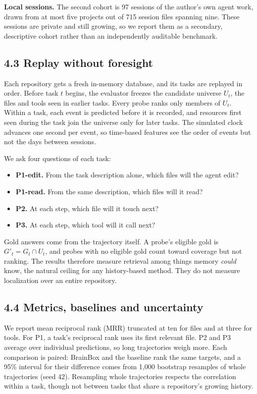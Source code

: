 \documentclass[
  american,
  11pt,
]{article}
\providecommand{\tightlist}{%
  \setlength{\itemsep}{0pt}\setlength{\parskip}{0pt}}
\begin{document}
\textbf{Local sessions.} The second cohort is 97 sessions of the author's own agent work, drawn from at most
five projects out of 715 session files spanning nine. These sessions are private and still growing, so we
report them as a secondary, descriptive cohort rather than an independently auditable benchmark.

\subsection{4.3 Replay without foresight}\label{replay-without-foresight}

Each repository gets a fresh in-memory database, and its tasks are replayed in order. Before task \(t\)
begins, the evaluator freezes the candidate universe \(U_t\), the files and tools seen in earlier tasks. Every
probe ranks only members of \(U_t\). Within a task, each event is predicted before it is recorded, and
resources first seen during the task join the universe only for later tasks. The simulated clock advances one
second per event, so time-based features see the order of events but not the days between sessions.

We ask four questions of each task:

\begin{itemize}
\tightlist
\item
  \textbf{P1-edit.} From the task description alone, which files will the agent edit?
\item
  \textbf{P1-read.} From the same description, which files will it read?
\item
  \textbf{P2.} At each step, which file will it touch next?
\item
  \textbf{P3.} At each step, which tool will it call next?
\end{itemize}

Gold answers come from the trajectory itself. A probe's eligible gold is \(G'_t=G_t\cap U_t\), and probes with
no eligible gold count toward coverage but not ranking. The results therefore measure retrieval among things
memory \emph{could} know, the natural ceiling for any history-based method. They do not measure localization
over an entire repository.

\subsection{4.4 Metrics, baselines and uncertainty}\label{metrics-baselines-and-uncertainty}

We report mean reciprocal rank (MRR) truncated at ten for files and at three for tools. For P1, a task's
reciprocal rank uses its first relevant file. P2 and P3 average over individual predictions, so long
trajectories weigh more. Each comparison is paired: BrainBox and the baseline rank the same targets, and a
95\% interval for their difference comes from 1,000 bootstrap resamples of whole trajectories (seed 42).
Resampling whole trajectories respects the correlation within a task, though not between tasks that share a
repository's growing history.
\end{document}
